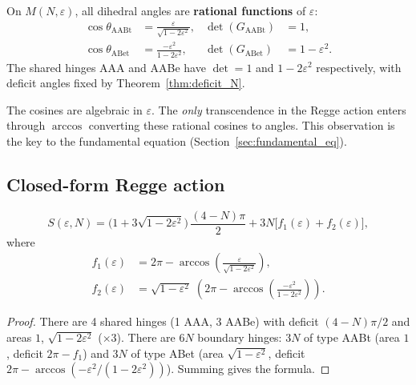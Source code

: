 \begin{remark}
\begin{theorem}
\label{thm:exact_dihedrals}
On $M(N,\varepsilon)$, all dihedral angles are \textbf{rational functions} of $\varepsilon$:
\begin{align}
\cos\theta_{\mathrm{AABt}} &= \frac{\varepsilon}{\sqrt{1 - 2\varepsilon^2}}, &
\det(G_{\mathrm{AABt}}) &= 1, \\[4pt]
\cos\theta_{\mathrm{ABet}} &= \frac{-\varepsilon^2}{1 - 2\varepsilon^2}, &
\det(G_{\mathrm{ABet}}) &= 1 - \varepsilon^2.
\end{align}
The shared hinges AAA and AABe have $\det = 1$ and $1\!-\!2\varepsilon^2$ respectively, with deficit angles fixed by Theorem~\ref{thm:deficit_N}.
\end{theorem}

\begin{remark}
The cosines are algebraic in $\varepsilon$.  The \emph{only} transcendence in the Regge action enters through $\arccos$ converting these rational cosines to angles.  This observation is the key to the fundamental equation (Section~\ref{sec:fundamental_eq}).
\end{remark}

\subsection{Closed-form Regge action}
\label{sec:closed_action}

\begin{theorem}
\label{thm:closed_action}
\begin{equation}
\boxed{S(\varepsilon,N) = \bigl(1 + 3\sqrt{1-2\varepsilon^2}\bigr)\,\frac{(4-N)\pi}{2} + 3N\bigl[f_1(\varepsilon) + f_2(\varepsilon)\bigr],}
\end{equation}
where
\begin{align}
f_1(\varepsilon) &= 2\pi - \arccos\!\left(\frac{\varepsilon}{\sqrt{1-2\varepsilon^2}}\right), \\[4pt]
f_2(\varepsilon) &= \sqrt{1-\varepsilon^2}\;\left(2\pi - \arccos\!\left(\frac{-\varepsilon^2}{1-2\varepsilon^2}\right)\right).
\end{align}
\end{theorem}
\begin{proof}
There are 4 shared hinges (1 AAA, 3 AABe) with deficit $(4\!-\!N)\pi/2$ and areas $1$, $\sqrt{1\!-\!2\varepsilon^2}$ ($\times 3$).  There are $6N$ boundary hinges: $3N$ of type AABt (area $1$, deficit $2\pi\!-\!f_1$) and $3N$ of type ABet (area $\sqrt{1\!-\!\varepsilon^2}$, deficit $2\pi\!-\!\arccos(-\varepsilon^2/(1\!-\!2\varepsilon^2))$).  Summing gives the formula.
\end{proof}


\end{remark}
